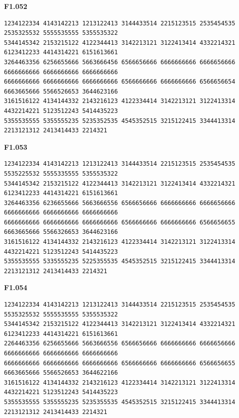 \noindent\begin{minipage}{\linewidth}\textbf{F1.052}
\begin{lstlisting}
1234122334 4143142213 1213122413 3144433514 2215123515 2535454535 2535325532 5555535555 5355535322
5344145342 2153215122 4122344413 3142213121 3122413414 4332214321 6123412233 4414314221 6151613661
3264463356 6256655666 5663666456 6566656666 6666666666 6666656666 6666666666 6666666666 6666666666
6666666666 6666666666 6666666666 6566666666 6666666666 6566656654 6663665666 5566526653 3644623166
3161516122 4134144332 2143216123 4122334414 3142213121 3122413314 4432214221 5123512243 5414435223
5355535555 5355555235 5235352535 4545352515 3215122415 3344413314 2213121312 2413414433 2214321
\end{lstlisting}
\end{minipage}\par\smallskip

\noindent\begin{minipage}{\linewidth}\textbf{F1.053}
\begin{lstlisting}
1234122334 4143142213 1213122413 3144433514 2215123515 2535454535 5535225532 5555335555 5355535322
5344145342 2153215122 4122344413 3142213121 3122413414 4332214321 6123412233 4414314221 6151613661
3264463356 6236655666 5663666556 6566656666 6666666666 6666656666 6666666666 6666666666 6666666666
6666666666 6666666666 6666666666 6566666666 6666666666 6566656655 6663665666 5566326653 3644623166
3161516122 4134144332 2143216123 4122334414 3142213121 3122413314 4432214221 5123512243 5414435223
5355535555 5335555235 5225355535 4545352515 3215122415 3344413314 2213121312 2413414433 2214321
\end{lstlisting}
\end{minipage}\par\smallskip

\noindent\begin{minipage}{\linewidth}\textbf{F1.054}
\begin{lstlisting}
1234122334 4143142213 1213122413 3144433514 2215123515 2535454535 5535325532 5555535555 5355535322
5344145342 2153215122 4122344413 3142213121 3122413414 4332214321 6123412233 4414314221 6151613661
2264463356 6256655666 5663666556 6566656666 6666666666 6666656666 6666666666 6666666666 6666666666
6666666666 6666666666 6666666666 6566666666 6666666666 6566656655 6663665666 5566526653 3644622166
3161516122 4134144332 2143216123 4122334414 3142213121 3122413314 4432214221 5123512243 5414435223
5355535555 5355555235 5235355535 4545352515 3215122415 3344413314 2213121312 2413414433 2214321
\end{lstlisting}
\end{minipage}\par\smallskip

